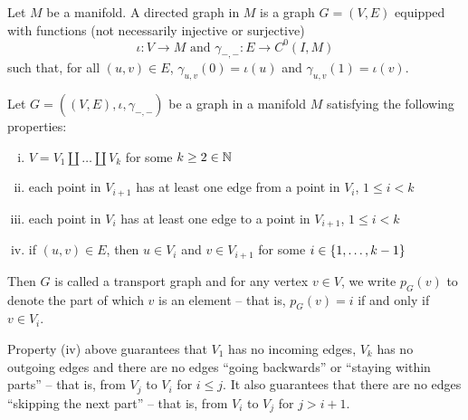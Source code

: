 \documentclass[./Thick_TQFTs_and_Quantum_Information.tex]{subfiles}
\begin{document}
\begin{defn}
Let $M$ be a manifold. A directed graph in $M$ is a graph $G = (V, E)$ equipped
with functions (not necessarily injective or surjective)
\[
  \iota : V \to M \text{ and } \gamma_{-, -} : E \to C^0(I, M)
\]
such that, for all $(u, v) \in E$, $\gamma_{u, v}(0) = \iota(u)$ and
$\gamma_{u, v}(1) = \iota(v)$.
\end{defn}

\begin{defn}
Let $G = ((V, E), \iota, \gamma_{-, -})$ be a graph in a manifold $M$ satisfying
the following properties:
\begin{enumerate}[(i)]
\setlength{\itemsep}{0pt}
\item $V = V_1 \amalg \dots \amalg V_k$ for some $k \geq 2 \in \mathbb{N}$
\item each point in $V_{i + 1}$ has at least one edge from a point in $V_{i}$,
$1 \leq i < k$
\item each point in $V_{i}$ has at least one edge to a point in $V_{i + 1}$,
$1 \leq i < k$
\item if $(u, v) \in E$, then $u \in V_i$ and $v \in V_{i + 1}$ for some
$i \in \set{1, \dots, k - 1}$
\end{enumerate}
Then $G$ is called a transport graph and for any vertex $v \in V$, we write
$p_{G}(v)$ to denote the part of which $v$ is an element -- that is,
$p_G(v) = i$ if and only if $v \in V_i$.
\end{defn}

\begin{rmk}
Property (iv) above guarantees that $V_1$ has no incoming edges, $V_k$ has no
outgoing edges and there are no edges ``going backwards'' or ``staying within
parts'' -- that is, from $V_j$ to $V_i$ for $i \leq j$. It also guarantees that
there are no edges ``skipping the next part'' -- that is, from $V_i$ to
$V_j$ for $j > i + 1$.
\end{rmk}
\end{document}
